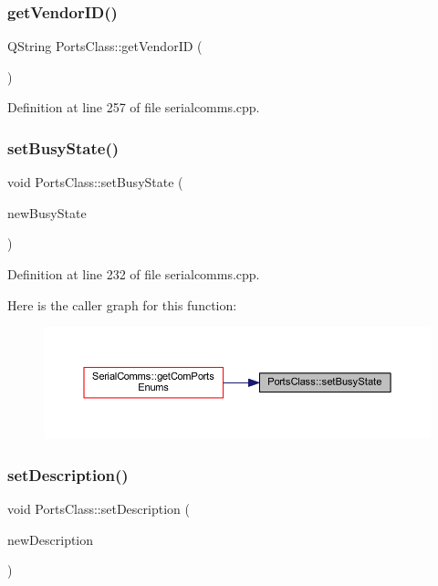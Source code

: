 \subsubsection{\texorpdfstring{getVendorID()}{getVendorID()}}
{\footnotesize\ttfamily Q\+String Ports\+Class\+::get\+Vendor\+ID (\begin{DoxyParamCaption}{ }\end{DoxyParamCaption})}



Definition at line 257 of file serialcomms.\+cpp.

\mbox{\label{classPortsClass_ad416a34e1604ee80c1aa3f45ac5b1d2c}} 
\subsubsection{\texorpdfstring{setBusyState()}{setBusyState()}}
{\footnotesize\ttfamily void Ports\+Class\+::set\+Busy\+State (\begin{DoxyParamCaption}\item[{Q\+String}]{new\+Busy\+State }\end{DoxyParamCaption})}



Definition at line 232 of file serialcomms.\+cpp.

Here is the caller graph for this function\+:
\nopagebreak
\begin{figure}[H]
\begin{center}
\leavevmode
\includegraphics[width=350pt]{classPortsClass_ad416a34e1604ee80c1aa3f45ac5b1d2c_icgraph}
\end{center}
\end{figure}
\mbox{\label{classPortsClass_a2f06af1956265d0079be56b9b85c3a0f}} 
\subsubsection{\texorpdfstring{setDescription()}{setDescription()}}
{\footnotesize\ttfamily void Ports\+Class\+::set\+Description (\begin{DoxyParamCaption}\item[{Q\+String}]{new\+Description }\end{DoxyParamCaption})}



